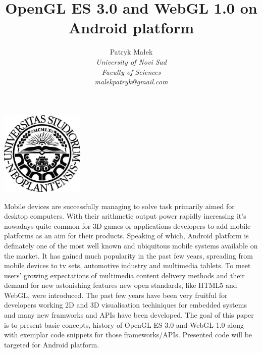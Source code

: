 \documentclass[a4paper,11pt]{article}
\renewenvironment{abstract}
{\itshape \small
  \begin{center}
  \bfseries \abstractname\vspace{-.5em}\vspace{0pt}
  \end{center}
  \list{}{
    \setlength{\leftmargin}{1.6cm}%
    \setlength{\rightmargin}{\leftmargin}%
  }%
  \item\relax}
{\endlist}
\begin{document}
\label{Title} 
\title{\textbf{OpenGL ES 3.0 and WebGL 1.0 on Android platform \vspace{4pc}}}
\author{\Large Patryk Małek\\
        \itshape University of Novi Sad\\
        Faculty of Sciences\\
        malekpatryk@gmail.com
        }
\date{}         %
\maketitle
\thispagestyle{empty}


\vspace{6pc}

\centerline{
\includegraphics[width=0.3\textwidth,height=0.3\textheight,keepaspectratio]{NoviSadLogoGray.jpg}
}

\vspace{6pc}

\begin{abstract}
\label{Abstract}
Mobile devices are successfully managing to solve task primarily aimed for desktop computers.
With their arithmetic output power rapidly increasing it's nowadays quite common for 3D games or applications developers to add mobile platforms as an aim for their products.  
Speaking of which, Android platform is definately one of the most well known and ubiquitous mobile systems available on the market.
It has gained much popularity in the past few years, spreading from mobile devices to tv sets, automotive industry and multimedia tablets. 
\newline To meet users' growing expectations of multimedia content delivery methods and their demand for new astonishing features new open standards, like HTML5 and WebGL, were introduced. 
The past few years have been very fruitful for developers working 2D and 3D visualisation techiniques for embedded systems and many new framworks and APIs have been developed.
\newline The goal of this paper is to present basic concepts, history of OpenGL ES 3.0 and WebGL 1.0 along with exemplar code snippets for those frameworks/APIs.
Presented code will be targeted for Android platform.
\end{abstract}
\pagebreak
\end{document}
